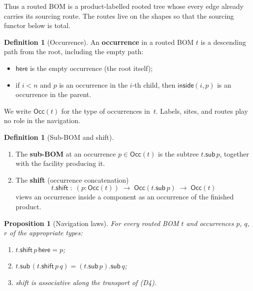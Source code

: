 \documentclass[11pt,a4paper]{article}
\theoremstyle{plain}
\newtheorem{proposition}[theorem]{Proposition}
\theoremstyle{definition}
\newtheorem{definition}[theorem]{Definition}
\newcommand{\Occ}{\mathsf{Occ}}
\begin{document}
Thus a routed BOM is a product-labelled rooted tree whose every edge
already carries its sourcing route. The routes live on the shapes so that
the sourcing functor below is total.

\begin{definition}[Occurrence]\label{def:occ}
An \textbf{occurrence} in a routed BOM $t$ is a descending path from the
root, including the empty path:
\begin{itemize}
  \item $\mathsf{here}$ is the empty occurrence (the root itself);
  \item if $i < n$ and $p$ is an occurrence in the $i$-th child, then
        $\mathsf{inside}(i,p)$ is an occurrence in the parent.
\end{itemize}
We write $\Occ(t)$ for the type of occurrences in~$t$. Labels, sites, and
routes play no role in the navigation.
\end{definition}

\begin{definition}[Sub-BOM and shift]\label{def:sub-shift}
\begin{enumerate}
  \item The \textbf{sub-BOM} at an occurrence $p \in \Occ(t)$ is the
        subtree $t.\mathsf{sub}\,p$, together with the facility
        producing it.
  \item The \textbf{shift} (occurrence concatenation)
        \[
          t.\mathsf{shift} \;:\;
          (p : \Occ(t)) \;\longrightarrow\;
          \Occ(t.\mathsf{sub}\,p) \;\longrightarrow\;
          \Occ(t)
        \]
        views an occurrence inside a component as an occurrence of the
        finished product.
\end{enumerate}
\end{definition}

\begin{proposition}[Navigation laws]\label{prop:nav}
For every routed BOM $t$ and occurrences $p$, $q$, $r$ of the appropriate
types:
\begin{enumerate}
  \item[\textup{(D3)}] $t.\mathsf{shift}\,p\,\mathsf{here} = p$;
  \item[\textup{(D4)}] $t.\mathsf{sub}\,(t.\mathsf{shift}\,p\,q)
        = (t.\mathsf{sub}\,p).\mathsf{sub}\,q$;
  \item[\textup{(D5)}] shift is associative along the transport of
        \textup{(D4)}.
\end{enumerate}
\end{proposition}
\end{document}
